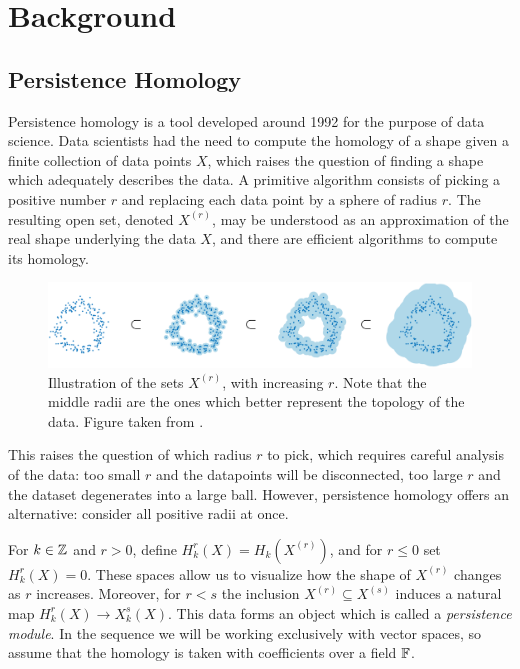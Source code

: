 
\section{Background}

\subsection{Persistence Homology}

Persistence homology is a tool developed around 1992 for the purpose of data science. Data scientists had the need to compute the homology of a shape given a finite collection of data points $X$, which raises the question of finding a shape which adequately describes the data. A primitive algorithm consists of picking a positive number $r$ and replacing each data point by a sphere of radius $r$. The resulting open set, denoted $X^{(r)}$, may be understood as an approximation of the real shape underlying the data $X$, and there are efficient algorithms to compute its homology.

\begin{figure}
\centering
\includegraphics[width=\linewidth]{data}
\caption{Illustration of the sets $X^{(r)}$, with increasing $r$. Note that the middle radii are the ones which better represent the topology of the data. Figure taken from \cite{historypersistence}.}
\end{figure}

This raises the question of which radius $r$ to pick, which requires careful analysis of the data: too small $r$ and the datapoints will be disconnected, too large $r$ and the dataset degenerates into a large ball. However, persistence homology offers an alternative: consider all positive radii at once.

For $k \in \mathbb{Z}$ and $r > 0$, define $H_k^r(X) = H_k(X^{(r)})$, and for $r \leq 0$ set $H_k^r(X) = 0$. These spaces allow us to visualize how the shape of $X^{(r)}$ changes as $r$ increases. Moreover, for $r < s$ the inclusion $X^{(r)} \subseteq X^{(s)}$ induces a natural map $H_k^r(X) \to X_k^s(X)$. This data forms an object which is called a \emph{persistence module}. In the sequence we will be working exclusively with vector spaces, so assume that the homology is taken with coefficients over a field $\mathbb{F}$.

